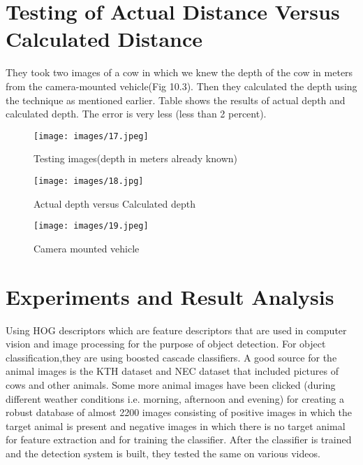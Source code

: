 \documentclass[14pt,a4paper,final]{extreport}
\begin{document}
\chapter{Testing of Actual Distance Versus Calculated Distance}
\item They took two images of a cow in which we knew the depth of the cow in meters from the camera-mounted vehicle(Fig 10.3). Then they calculated the depth using the technique as mentioned earlier. Table shows the results of actual depth and calculated depth. The error is very less (less than 2 percent).

\begin{figure}[h]
	\begin{center}
		\texttt{[image: images/17.jpeg]}
		\vspace{.1 cm}
		\caption[Testing images(depth in meters already known)]{Testing images(depth in meters already known)}
	\end{center}
\end{figure}

\begin{figure}[h]
	\begin{center}
		\texttt{[image: images/18.jpg]}
		\vspace{.1 cm}
		\caption[Actual depth versus Calculated depth]{Actual depth versus Calculated depth}
	\end{center}
\end{figure}

\begin{figure}[h]
	\begin{center}
		\texttt{[image: images/19.jpeg]}
		\vspace{.1 cm}
		\caption[Camera mounted vehicle]{Camera mounted vehicle}
	\end{center}
\end{figure}

\chapter{Experiments and Result Analysis}
\item Using HOG descriptors which are feature descriptors that are used in computer vision and image processing for the purpose of object detection. For object classification,they are using boosted cascade classifiers. A good source for the animal images is the KTH dataset and NEC dataset that included pictures of cows and other animals. Some more animal images have been clicked (during different weather conditions i.e. morning, afternoon and evening) for creating a robust database of almost 2200 images consisting of positive images in which the target animal is present and negative images in which there is no target animal for feature extraction and for training the classifier. After the classifier is trained and the detection system is built, they tested the same on various videos.
\end{document}
